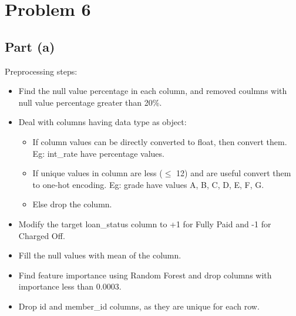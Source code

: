 \documentclass[12pt]{article}
\begin{document}
\section*{Problem 6}
\subsection*{Part (a)}
Preprocessing steps:
\begin{itemize}
    \item Find the null value percentage in each column, and removed coulmns with null value percentage greater than 20\%.
    \item Deal with columns having data type as object:
    \begin{itemize}
        \item If column values can be directly converted to float, then convert them. Eg: int\_rate have percentage values.
        \item If unique values in column are less ($\leq$ 12) and are useful convert them to one-hot encoding. Eg: grade have values A, B, C, D, E, F, G.
        \item Else drop the column.
    \end{itemize}
    \item Modify the target loan\_status column to +1 for Fully Paid and -1 for Charged Off.
    \item Fill the null values with mean of the column.
    \item Find feature importance using Random Forest and drop columns with importance less than 0.0003. 
    \item Drop id and member\_id columns, as they are unique for each row.
\end{itemize}
\end{document}
